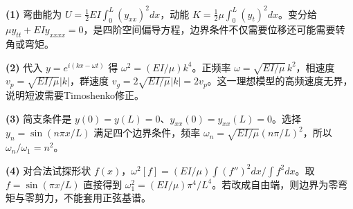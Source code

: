 \par\noindent\textbf{(1)} 弯曲能为 \(U=\tfrac12EI\int_0^L(y_{xx})^2dx\)，动能 \(K=\tfrac12\mu\int_0^L(y_t)^2dx\)。变分给 \(\mu y_{tt}+EIy_{xxxx}=0\)，是四阶空间偏导方程，边界条件不仅需要位移还可能需要转角或弯矩。
\par\noindent\textbf{(2)} 代入 \(y=e^{i(kx-\omega t)}\) 得 \(\omega^2=(EI/\mu)k^4\)。正频率 \(\omega=\sqrt{EI/\mu}\,k^2\)，相速度 \(v_p=\sqrt{EI/\mu}|k|\)，群速度 \(v_g=2\sqrt{EI/\mu}|k|=2v_p\)。这一理想模型的高频速度无界，说明短波需要Timoshenko修正。
\par\noindent\textbf{(3)} 简支条件是 \(y(0)=y(L)=0\)、\(y_{xx}(0)=y_{xx}(L)=0\)。选择 \(y_n=\sin(n\pi x/L)\) 满足四个边界条件，频率 \(\omega_n=\sqrt{EI/\mu}(n\pi/L)^2\)，所以 \(\omega_n/\omega_1=n^2\)。
\par\noindent\textbf{(4)} 对合法试探形状 \(f(x)\)，\(\omega^2[f]=(EI/\mu)\int(f'')^2dx/\int f^2dx\)。取 \(f=\sin(\pi x/L)\) 直接得到 \(\omega_1^2=(EI/\mu)\pi^4/L^4\)。若改成自由端，则边界为零弯矩与零剪力，不能套用正弦基谱。
